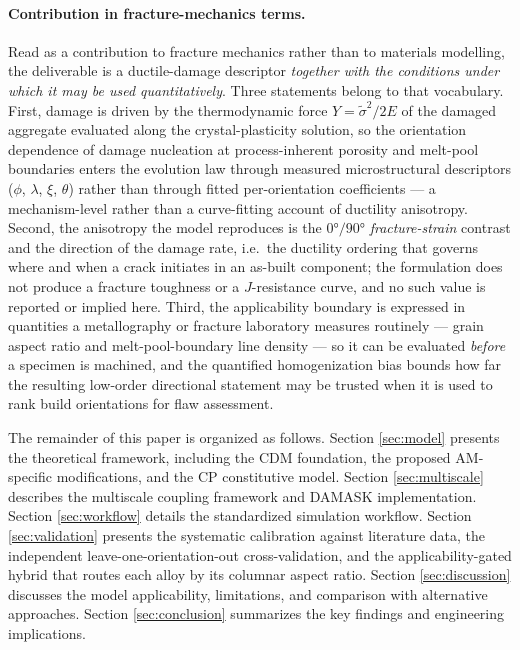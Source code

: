 \paragraph{Contribution in fracture-mechanics terms.}
Read as a contribution to fracture mechanics rather than to materials modelling, the deliverable is a ductile-damage descriptor \emph{together with the conditions under which it may be used quantitatively}. Three statements belong to that vocabulary. First, damage is driven by the thermodynamic force $Y=\tilde{\sigma}^{2}/2E$ of the damaged aggregate evaluated along the crystal-plasticity solution, so the orientation dependence of damage nucleation at process-inherent porosity and melt-pool boundaries enters the evolution law through measured microstructural descriptors ($\phi$, $\lambda$, $\xi$, $\theta$) rather than through fitted per-orientation coefficients --- a mechanism-level rather than a curve-fitting account of ductility anisotropy. Second, the anisotropy the model reproduces is the $\ang{0}/\ang{90}$ \emph{fracture-strain} contrast and the direction of the damage rate, i.e.\ the ductility ordering that governs where and when a crack initiates in an as-built component; the formulation does not produce a fracture toughness or a $J$-resistance curve, and no such value is reported or implied here. Third, the applicability boundary is expressed in quantities a metallography or fracture laboratory measures routinely --- grain aspect ratio and melt-pool-boundary line density --- so it can be evaluated \emph{before} a specimen is machined, and the quantified homogenization bias bounds how far the resulting low-order directional statement may be trusted when it is used to rank build orientations for flaw assessment.

The remainder of this paper is organized as follows. Section \ref{sec:model} presents the theoretical framework, including the CDM foundation, the proposed AM-specific modifications, and the CP constitutive model. Section \ref{sec:multiscale} describes the multiscale coupling framework and DAMASK implementation. Section \ref{sec:workflow} details the standardized simulation workflow. Section \ref{sec:validation} presents the systematic calibration against literature data, the independent leave-one-orientation-out cross-validation, and the applicability-gated hybrid that routes each alloy by its columnar aspect ratio. Section \ref{sec:discussion} discusses the model applicability, limitations, and comparison with alternative approaches. Section \ref{sec:conclusion} summarizes the key findings and engineering implications.

